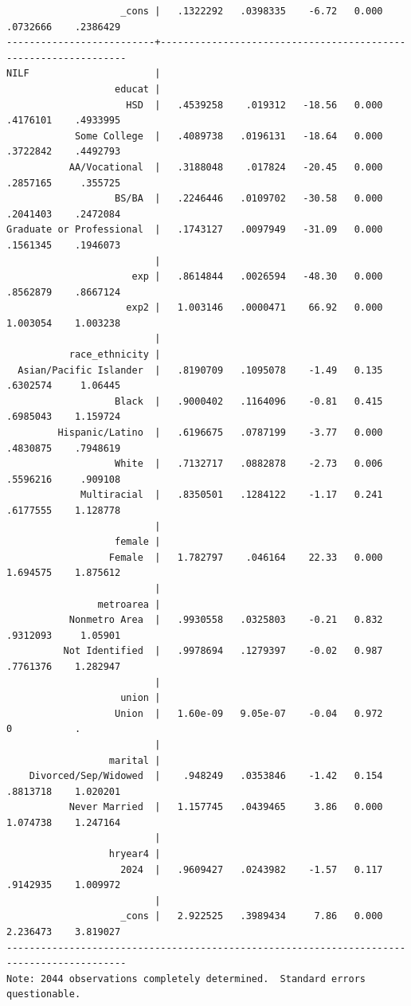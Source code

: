 \documentclass[
]{book}
\begin{document}
\begin{verbatim}
                    _cons |   .1322292   .0398335    -6.72   0.000     .0732666    .2386429
--------------------------+----------------------------------------------------------------
NILF                      |
                   educat |
                     HSD  |   .4539258    .019312   -18.56   0.000     .4176101    .4933995
            Some College  |   .4089738   .0196131   -18.64   0.000     .3722842    .4492793
           AA/Vocational  |   .3188048    .017824   -20.45   0.000     .2857165     .355725
                   BS/BA  |   .2246446   .0109702   -30.58   0.000     .2041403    .2472084
Graduate or Professional  |   .1743127   .0097949   -31.09   0.000     .1561345    .1946073
                          |
                      exp |   .8614844   .0026594   -48.30   0.000     .8562879    .8667124
                     exp2 |   1.003146   .0000471    66.92   0.000     1.003054    1.003238
                          |
           race_ethnicity |
  Asian/Pacific Islander  |   .8190709   .1095078    -1.49   0.135     .6302574     1.06445
                   Black  |   .9000402   .1164096    -0.81   0.415     .6985043    1.159724
         Hispanic/Latino  |   .6196675   .0787199    -3.77   0.000     .4830875    .7948619
                   White  |   .7132717   .0882878    -2.73   0.006     .5596216     .909108
             Multiracial  |   .8350501   .1284122    -1.17   0.241     .6177555    1.128778
                          |
                   female |
                  Female  |   1.782797    .046164    22.33   0.000     1.694575    1.875612
                          |
                metroarea |
           Nonmetro Area  |   .9930558   .0325803    -0.21   0.832     .9312093     1.05901
          Not Identified  |   .9978694   .1279397    -0.02   0.987     .7761376    1.282947
                          |
                    union |
                   Union  |   1.60e-09   9.05e-07    -0.04   0.972            0           .
                          |
                  marital |
    Divorced/Sep/Widowed  |    .948249   .0353846    -1.42   0.154     .8813718    1.020201
           Never Married  |   1.157745   .0439465     3.86   0.000     1.074738    1.247164
                          |
                  hryear4 |
                    2024  |   .9609427   .0243982    -1.57   0.117     .9142935    1.009972
                          |
                    _cons |   2.922525   .3989434     7.86   0.000     2.236473    3.819027
-------------------------------------------------------------------------------------------
Note: 2044 observations completely determined.  Standard errors questionable.
\end{verbatim}
\end{document}
